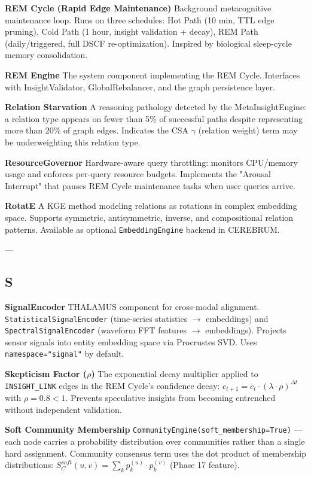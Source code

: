 \documentclass[11pt,article,oneside]{memoir}
\begin{document}
\textbf{REM Cycle (Rapid Edge Maintenance)}
Background metac\-ognitive maintenance loop. Runs on three schedules: Hot Path (10 min, TTL edge pruning), Cold Path (1 hour, insight validation + decay), REM Path (daily/triggered, full DSCF re-optim\-ization). Inspired by biological sleep-cycle memory conso\-lidation.

\textbf{REM Engine}
The system component imple\-menting the REM Cycle. Interfaces with InsightValidator, GlobalRebalancer, and the graph persistence layer.

\textbf{Relation Starvation}
A reasoning pathology detected by the MetaInsightEngine: a relation type appears on fewer than 5\% of successful paths despite repre\-senting more than 20\% of graph edges. Indicates the CSA $\gamma$ (relation weight) term may be under\-weighting this relation type.

\textbf{ResourceGovernor}
Hardware-aware query throttling: monitors CPU/memory usage and enforces per-query resource budgets. Implements the "Arousal Interrupt" that pauses REM Cycle maintenance tasks when user queries arrive.

\textbf{RotatE}
A KGE method modeling relations as rotations in complex embedding space. Supports symmetric, antis\-ymmetric, inverse, and compo\-sitional relation patterns. Available as optional \texttt{EmbeddingEngine} backend in CEREBRUM.

---

\subsection{S}

\textbf{SignalEncoder}
THALAMUS component for cross-modal alignment. \texttt{StatisticalSignalEncoder} (time-series statistics $\to$ embeddings) and \texttt{SpectralSignalEncoder} (waveform FFT features $\to$ embeddings). Projects sensor signals into entity embedding space via Procrustes SVD. Uses \texttt{namespace="signal"} by default.

\textbf{Skepticism Factor ($\rho$)}
The exponential decay multiplier applied to \texttt{INSIGHT\_LINK} edges in the REM Cycle's confidence decay: $c_{t+1} = c_t \cdot (\lambda \cdot \rho)^{\Delta t}$ with $\rho = 0.8 < 1$. Prevents speculative insights from becoming entrenched without independent validation.

\textbf{Soft Community Membership}
\texttt{CommunityEngine(soft\_membership=True)} — each node carries a probability distr\-ibution over communities rather than a single hard assignment. Community consensus term uses the dot product of membership distr\-ibutions: $S_C^{soft}(u,v) = \sum_k p_k^{(u)} \cdot p_k^{(v)}$ (Phase 17 feature).
\end{document}
